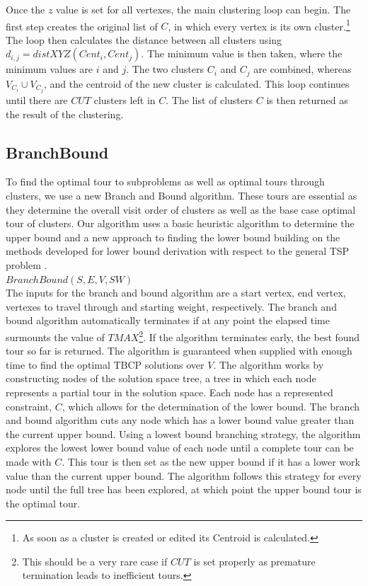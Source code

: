 \documentclass[sigconf, anonymous, pdftex]{acmart}
\begin{document}
Once the $z$ value is set for all vertexes, the main clustering loop can begin. The first step creates the original list of $C$, in which every vertex is its own cluster.\footnote{As soon as a cluster is created or edited its Centroid is calculated.} The loop then calculates the distance between all clusters using $d_{i,j} = distXYZ(Cent_i, Cent_j)$. The minimum value is then taken, where the minimum values are $i$ and $j$. The two clusters $C_i$ and $C_j$ are combined, whereas $V_{C_i} \cup V_{C_j}$, and the centroid of the new cluster is calculated. This loop continues until there are $CUT$ clusters left in $C$. The list of clusters $C$ is then returned as the result of the clustering. 

\subsection{BranchBound}
To find the optimal tour to subproblems as well as optimal tours through clusters, we use a new Branch and Bound algorithm. These tours are essential as they determine the overall visit order of clusters as well as the base case optimal tour of clusters. Our algorithm uses a basic heuristic algorithm to determine the upper bound and a new approach to finding the lower bound building on the methods developed for lower bound derivation with respect to the general TSP problem \cite{TravelingMST}. \\

$BranchBound(S, E, V, SW)$\\

The inputs for the branch and bound algorithm are a start vertex, end vertex, vertexes to travel through and starting weight, respectively. The branch and bound algorithm automatically terminates if at any point the elapsed time surmounts the value of $TMAX$\footnote{This should be a very rare case if $CUT$ is set properly as premature termination leads to inefficient tours.}. If the algorithm terminates early, the best found tour so far is returned. The algorithm is guaranteed when supplied with enough time to find the optimal TBCP solutions over $V$. The algorithm works by constructing nodes of the solution space tree, a tree in which each node represents a partial tour in the solution space. Each node has a represented constraint, $C$, which allows for the determination of the lower bound. The branch and bound algorithm cuts any node which has a lower bound value greater than the current upper bound. Using a lowest bound branching strategy, the algorithm explores the lowest lower bound value of each node until a complete tour can be made with $C$. This tour is then set as the new upper bound if it has a lower work value than the current upper bound. The algorithm follows this strategy for every node until the full tree has been explored, at which point the upper bound tour is the optimal tour.
\end{document}

